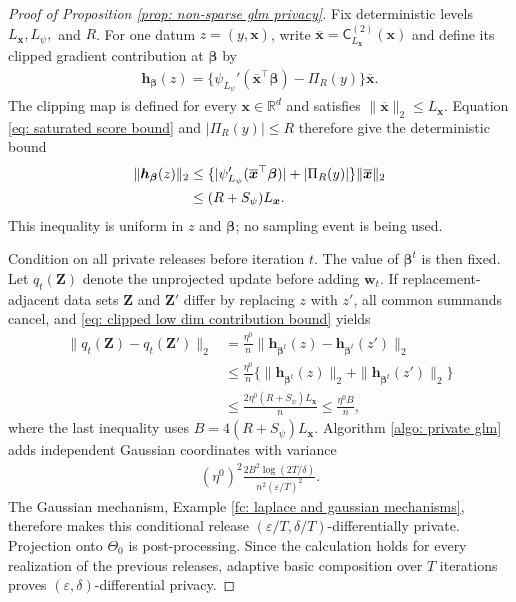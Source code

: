 \documentclass[letterpaper,12pt]{article}
\numberwithin{equation}{section}
\theoremstyle{plain}
\numberwithin{Theorem}{section}
\numberwithin{proposition}{section}
\numberwithin{Lemma}{section}
{
	\theoremstyle{definition}
	\newtheorem{Definition}{Definition}
	\newtheorem{example}{Example}
	\numberwithin{example}{section}
	\newtheorem{fact}{Fact}
	\numberwithin{fact}{section}
	\newtheorem{remark}{Remark}
}
\newcommand{\1}{\mathbbm{1}}
\def\bbeta{{\boldsymbol{\beta}}}
\begin{document}
\begin{proof}[Proof of Proposition \ref{prop: non-sparse glm privacy}]
	Fix deterministic levels $L_{\bm x},L_\psi,$ and $R$. For one datum
	$z=(y,\bm x)$, write $\overline{\bm x}=\mathsf C_{L_{\bm x}}^{(2)}(\bm x)$ and define its clipped gradient contribution at $\bbeta$ by
	\begin{align*}
		\bm h_{\bbeta}(z)
		=\{\psi_{L_\psi}'(\overline{\bm x}^{\top}\bbeta)-\Pi_R(y)\}
		\overline{\bm x}.
	\end{align*}
	The clipping map is defined for every $\bm x\in\mathbb R^d$ and satisfies
	$\|\overline{\bm x}\|_2\leq L_{\bm x}$. Equation
	\eqref{eq: saturated score bound} and $|\Pi_R(y)|\leq R$ therefore
	give the deterministic bound
	\begin{align}
		\|\bm h_{\bbeta}(z)\|_2
		&\leq
		\{|\psi_{L_\psi}'(\overline{\bm x}^{\top}\bbeta)|+|\Pi_R(y)|\}
		\|\overline{\bm x}\|_2\notag\\
		&\leq(R+S_\psi)L_{\bm x}.                    \label{eq: clipped low dim contribution bound}
	\end{align}
	This inequality is uniform in $z$ and $\bbeta$; no sampling event is being used.

	Condition on all private releases before iteration $t$.  The value of
	$\bbeta^t$ is then fixed.  Let $q_t(\bm Z)$ denote the unprojected update before adding $\bm w_t$.  If replacement-adjacent data sets $\bm Z$ and $\bm Z'$ differ by replacing $z$ with $z'$, all common summands cancel, and \eqref{eq: clipped low dim contribution bound} yields
	\begin{align*}
	\|q_t(\bm Z)-q_t(\bm Z')\|_2
	&=\frac{\eta^0}{n}
	\|\bm h_{\bbeta^t}(z)-\bm h_{\bbeta^t}(z')\|_2\\
	&\leq\frac{\eta^0}{n}
	\{\|\bm h_{\bbeta^t}(z)\|_2+
	\|\bm h_{\bbeta^t}(z')\|_2\}\\
	&\leq\frac{2\eta^0(R+S_\psi)L_{\bm x}}{n}
	\leq\frac{\eta^0B}{n},
	\end{align*}
	where the last inequality uses $B=4(R+S_\psi)L_{\bm x}$.
	Algorithm \ref{algo: private glm} adds independent Gaussian coordinates with variance
	\begin{align*}
	(\eta^0)^2\frac{2B^2\log(2T/\delta)}
	{n^2(\varepsilon/T)^2}.
	\end{align*}
	The Gaussian mechanism, Example \ref{fc: laplace and gaussian mechanisms}, therefore makes this conditional release $(\varepsilon/T,\delta/T)$-differentially private.  Projection onto $\Theta_0$ is post-processing.  Since the calculation holds for every realization of the previous releases, adaptive basic composition over $T$ iterations proves $(\varepsilon,\delta)$-differential privacy.
\end{proof}
\end{document}
